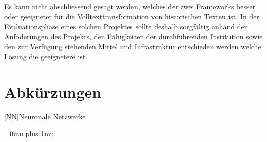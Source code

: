 \documentclass[a4paper,oneside, 12pt]{report}
\begin{document}
Es kann nicht abschliessend gesagt werden, welches der zwei Frameworks besser oder geeigneter für die Volltexttransformation von historischen Texten ist. In der Evaluationsphase eines solchen Projektes sollte deshalb sorgfältig anhand der Anfoderungen des Projekts, den Fähigkeiten der durchführenden Institution sowie den zur Verfügung stehenden Mittel und Infrastruktur entschieden werden welche Lösung die geeignetere ist.





\cleardoublepage
{}
{}
\chapter*{Abkürzungen}
\begin{acronym}[Abkürzungen]
    [NN]{Neuronale Netzwerke}
\end{acronym}

\cleardoublepage
{}
{}
\Urlmuskip=0mu plus 1mu\relax
\end{document}
